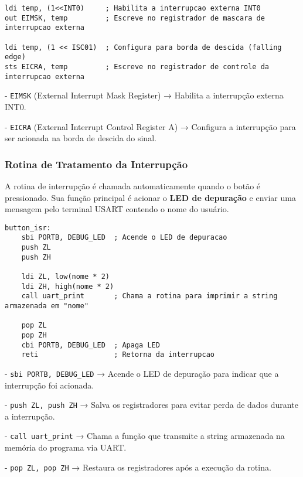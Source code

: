\documentclass{sbrt}
\begin{document}
\begin{lstlisting}[style=assemblyStyle, caption={Configuracao da interrupcao externa INT0}, label={lst:button_int}]
ldi temp, (1<<INT0)     ; Habilita a interrupcao externa INT0
out EIMSK, temp         ; Escreve no registrador de mascara de interrupcao externa

ldi temp, (1 << ISC01)  ; Configura para borda de descida (falling edge)
sts EICRA, temp         ; Escreve no registrador de controle da interrupcao externa
\end{lstlisting}

- \texttt{EIMSK} (External Interrupt Mask Register) → Habilita a interrupção externa INT0.

- \texttt{EICRA} (External Interrupt Control Register A) → Configura a interrupção para ser acionada na borda de descida do sinal.

\subsubsection{Rotina de Tratamento da Interrupção}

A rotina de interrupção é chamada automaticamente quando o botão é pressionado. Sua função principal é acionar o \textbf{LED de depuração} e enviar uma mensagem pelo terminal USART contendo o nome do usuário.

\begin{lstlisting}[style=assemblyStyle, caption={Rotina de Tratamento da Interrupcao INT0}, label={lst:button_isr}]
button_isr:
    sbi PORTB, DEBUG_LED  ; Acende o LED de depuracao
    push ZL
    push ZH

    ldi ZL, low(nome * 2)
    ldi ZH, high(nome * 2)
    call uart_print       ; Chama a rotina para imprimir a string armazenada em "nome"

    pop ZL
    pop ZH
    cbi PORTB, DEBUG_LED  ; Apaga LED
    reti                  ; Retorna da interrupcao
\end{lstlisting}

- \texttt{sbi PORTB, DEBUG\_LED} → Acende o LED de depuração para indicar que a interrupção foi acionada.

- \texttt{push ZL, push ZH} → Salva os registradores para evitar perda de dados durante a interrupção.

- \texttt{call uart\_print} → Chama a função que transmite a string armazenada na memória do programa via UART.

- \texttt{pop ZL, pop ZH} → Restaura os registradores após a execução da rotina.
\end{document}
